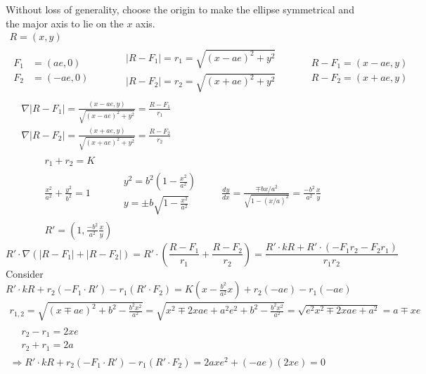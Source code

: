 \documentclass[twoside]{amsart}
\theoremstyle{plain}
\theoremstyle{definition}
\newcommand{\exercisehead}[1]
  {
   \noindent{\small\bf Exercise #1.}
   \smallskip}
\begin{document}
\exercisehead{11} Without loss of generality, choose the origin to make the ellipse symmetrical and the major axis to lie on the $x$ axis. 
\[
\begin{gathered}
  R = (x,y) \\
  \begin{aligned}
    F_1 & = (ae,0) \\
    F_2 & = (-ae,0) 
  \end{aligned} \quad \quad \, \begin{aligned}
    & |R- F_1| = r_1 = \sqrt{ (x-ae)^2 + y^2 } \\
    & |R-F_2| = r_2 = \sqrt{ (x+ae)^2 + y^2 }
\end{aligned} \quad \quad \begin{aligned}
    & R - F_1 = (x-ae,y) \\ 
    & R - F_2 = (x+ae,y) 
\end{aligned} \\
\begin{aligned}
  & \nabla |R-F_1| = \frac{ (x-ae, y) }{ \sqrt{ (x-ae)^2 + y^2 } } = \frac{ R-F_1}{r_1} \\
  & \nabla |R- F_2| =  \frac{ (x+ae,y) }{ \sqrt{ (x+ae)^2 + y^2 } } =  \frac{ R-F_2}{r_2} 
\end{aligned}
\end{gathered}
\]
\[
\begin{gathered}
  r_1 + r_2 = K \\
  \frac{ x^2}{a^2} + \frac{y^2}{b^2} = 1 \quad \quad \, \begin{aligned}
    & y^2 = b^2 \left( 1 - \frac{x^2}{a^2} \right) \\
    & y = \pm b \sqrt{ 1 - \frac{x^2}{a^2} }
  \end{aligned} \quad \quad \, \frac{dy}{dx} = \frac{ \mp bx/a^2}{ \sqrt{ 1 - (x/a)^2 }} = \frac{-b^2}{a^2} \frac{x}{y} \\
R' = (1, \frac{-b^2}{a^2 } \frac{x}{y} )
\end{gathered}
\]
\[
R' \cdot \nabla (|R-F_1| + |R-F_2|) = R' \cdot \left( \frac{R - F_1}{r_1} + \frac{R-F_2}{r_2} \right) = \frac{ R' \cdot kR + R' \cdot( -F_1 r_2 - F_2 r_1 ) }{ r_1 r_2 } 
\]
Consider $R' \cdot k R + r_2 (-F_1 \cdot R') - r_1 (R'\cdot F_2) = K (x -\frac{b^2}{a^2} x ) + r_2 (-ae) - r_1 (-ae)$
\[
\begin{gathered}
  r_{1,2} = \sqrt{ (x \mp ae)^2 + b^2 - \frac{b^2 x^2}{a^2} } = \sqrt{ x^2 \mp 2xae + a^2 e^2 + b^2 - \frac{b^2 x^2}{a^2} } = \sqrt{ e^2 x^2 \mp 2xae + a^2 } = a \mp xe \\
  \begin{aligned}
    & r_2 - r_1 = 2xe \\
    & r_2 + r_1 = 2a 
  \end{aligned} \\
  \Longrightarrow R'\cdot kR + r_2 (-F_1 \cdot R') - r_1 (R' \cdot F_2) = 2ax e^2 + (-ae)(2xe) = 0 
\end{gathered}
\]
\end{document}
